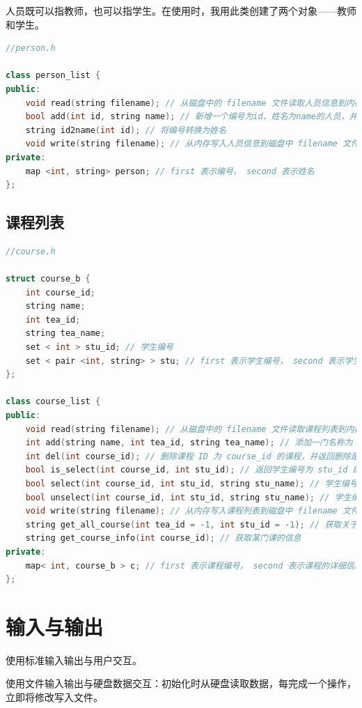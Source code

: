 \documentclass{article}
\begin{document}
人员既可以指教师，也可以指学生。在使用时，我用此类创建了两个对象——教师和学生。

\begin{lstlisting}[language=C++]
//person.h

class person_list {
public:
    void read(string filename); // 从磁盘中的 filename 文件读取人员信息到内存
    bool add(int id, string name); // 新增一个编号为id、姓名为name的人员，并返回添加是否成功
    string id2name(int id); // 将编号转换为姓名
    void write(string filename); // 从内存写入人员信息到磁盘中 filename 文件
private:
    map <int, string> person; // first 表示编号， second 表示姓名
};
\end{lstlisting}

\subsection{课程列表}

\begin{lstlisting}[language=C++]
//course.h

struct course_b {
    int course_id;
    string name;
    int tea_id;
    string tea_name;
    set < int > stu_id; // 学生编号
    set < pair <int, string> > stu; // first 表示学生编号， second 表示学生姓名
};

class course_list {
public:
    void read(string filename); // 从磁盘中的 filename 文件读取课程列表到内存
    int add(string name, int tea_id, string tea_name); // 添加一门名称为 name 的课程，教师编号为 tea_id ，教师姓名为 tea_name ，并返回课程 ID
    int del(int course_id); // 删除课程 ID 为 course_id 的课程，并返回删除是否成功
    bool is_select(int course_id, int stu_id); // 返回学生编号为 stu_id 的学生是否选择了课程编号为 course_id 的课程
    bool select(int course_id, int stu_id, string stu_name); // 学生编号为 stu_id 、学生姓名为 stu_name 的学生选择课程编号为 course_id 的课程，并返回选课是否成功
    bool unselect(int course_id, int stu_id, string stu_name); // 学生编号为 stu_id 、学生姓名为 stu_name 的学生退出课程编号为 course_id 的课程，并返回退课是否成功
    void write(string filename); // 从内存写入课程列表到磁盘中 filename 文件
    string get_all_course(int tea_id = -1, int stu_id = -1); // 获取关于该用户的所有课程
    string get_course_info(int course_id); // 获取某门课的信息
private:
    map< int, course_b > c; // first 表示课程编号， second 表示课程的详细信息
};
\end{lstlisting}

\section{输入与输出}

使用标准输入输出与用户交互。

使用文件输入输出与硬盘数据交互：初始化时从硬盘读取数据，每完成一个操作，立即将修改写入文件。
\end{document}
